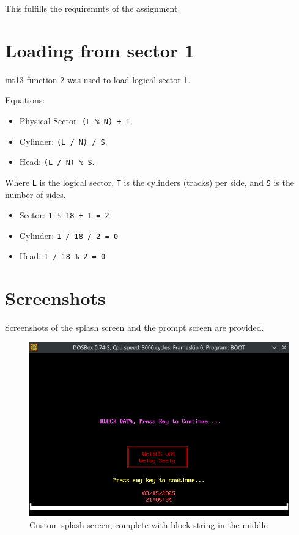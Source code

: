 \documentclass{article}
\begin{document}
    This fulfills the requiremnts of the assignment.

    \section{Loading from sector 1}\label{sec:reqs}
    int13 function 2 was used to load logical sector 1.

    Equations:
    \begin{itemize}
        \item Physical Sector: \verb|(L % N) + 1|.
        \item Cylinder: \verb|(L / N) / S|.
        \item Head: \verb|(L / N) % S|.
    \end{itemize}
    Where \verb|L| is the logical sector, \verb|T| is the cylinders (tracks) per side, and \verb|S| is the number of sides.

    \begin{itemize}
        \item Sector: \verb|1 % 18 + 1 = 2|
        \item Cylinder: \verb|1 / 18 / 2 = 0|
        \item Head: \verb|1 / 18 % 2 = 0|
    \end{itemize}

    \section{Screenshots}\label{sec:screenshots}
    Screenshots of the splash screen and the prompt screen are provided.

    \begin{figure}[H]  %
        \centering
        \includegraphics[width=\textwidth]{splash-screen} %
        \caption{Custom splash screen, complete with block string in the middle}
        \label{fig:1}
    \end{figure}
\end{document}
